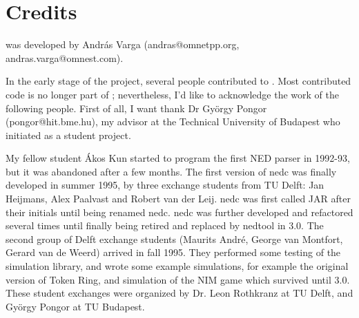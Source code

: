 %
%
%
%
%
%
%
%
%
%
%
%
%
%
%
%
%
%
%
%
%


\section{Credits}

{\omnetpp} was developed by Andr\'{a}s Varga (andras@omnetpp.org,
andras.varga@omnest.com).

In the early stage of the project, several people contributed
to {\omnetpp}. Most contributed code is no longer part of
{\omnetpp}; nevertheless, I'd like to acknowledge the work of the
following people. First of all, I want thank Dr Gy\"{o}rgy Pongor
(pongor@hit.bme.hu), my advisor at the Technical University of Budapest
who initiated {\omnetpp} as a student project.

My fellow student \'{A}kos Kun started to program the first NED parser
in 1992-93, but it was abandoned after a few months.
The first version of nedc was finally developed in summer 1995,
by three exchange students from TU Delft: Jan Heijmans, Alex Paalvast
and Robert van der Leij. nedc was first called JAR after their initials
until being renamed nedc. nedc was further developed and refactored
several times until finally being retired and replaced by nedtool in {\omnetpp} 3.0.
The second group of Delft exchange students (Maurits Andr\'{e},
George van Montfort, Gerard van de Weerd) arrived in fall 1995.
They performed some testing of the simulation library, and
wrote some example simulations, for example the original version of Token Ring,
and simulation of the NIM game which survived until {\omnetpp} 3.0.
These student exchanges were organized by Dr. Leon Rothkranz
at TU Delft, and Gy\"{o}rgy Pongor at TU Budapest.

